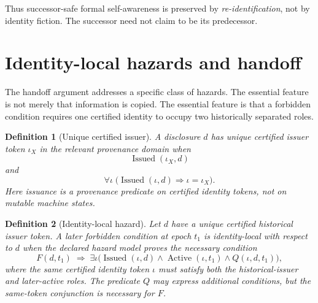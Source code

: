 \documentclass[11pt]{article}
\newtheorem{definition}{Definition}[section]
\theoremstyle{remark}
\newcommand{\Issued}{\operatorname{Issued}}
\newcommand{\Active}{\operatorname{Active}}
\begin{document}
Thus successor-safe formal self-awareness is preserved by \emph{re-identification}, not by identity fiction. The successor need not claim to be its predecessor.

\section{Identity-local hazards and handoff}

The handoff argument addresses a specific class of hazards. The essential feature is not merely that information is copied. The essential feature is that a forbidden condition requires one certified identity to occupy two historically separated roles.

\begin{definition}[Unique certified issuer]
A disclosure $d$ has unique certified issuer token $\iota_X$ in the relevant provenance domain when
\[
\Issued(\iota_X,d)
\]
and
\[
\forall \iota\;\bigl(\Issued(\iota,d)\Longrightarrow \iota=\iota_X\bigr).
\]
Here issuance is a provenance predicate on certified identity tokens, not on mutable machine states.
\end{definition}

\begin{definition}[Identity-local hazard]
Let $d$ have a unique certified historical issuer token. A later forbidden condition at epoch $t_1$ is \emph{identity-local with respect to $d$} when the declared hazard model proves the necessary condition
\[
F(d,t_1)\;\Longrightarrow\;
\exists \iota\bigl(\Issued(\iota,d)\land\Active(\iota,t_1)\land Q(\iota,d,t_1)\bigr),
\]
where the same certified identity token $\iota$ must satisfy both the historical-issuer and later-active roles. The predicate $Q$ may express additional conditions, but the same-token conjunction is necessary for $F$.
\end{definition}
\end{document}
